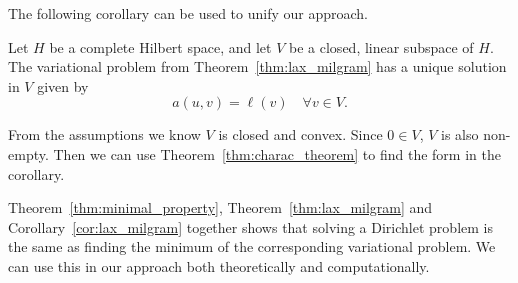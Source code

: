 The following corollary can be used to unify our approach.
\begin{kor}{\quad}
    Let $H$ be a complete Hilbert space, and let $V$ be a closed, linear subspace of $H$. The variational problem from Theorem~\ref{thm:lax_milgram} has a unique solution in $V$ given by\label{cor:lax_milgram}
   \begin{equation*}
    a(u,v) = \ell(v) \quad \forall v \in V.
   \end{equation*}
   \vspace{-8mm}
\end{kor}
\begin{bev}
    From the assumptions we know $V$ is closed and convex. Since $0 \in V$, $V$ is also non-empty. Then we can use Theorem~\ref{thm:charac_theorem} to find the form in the corollary.
\end{bev}
Theorem~\ref{thm:minimal_property}, Theorem~\ref{thm:lax_milgram} and Corollary~\ref{cor:lax_milgram} together shows that solving a Dirichlet problem is 
the same as finding the minimum of the corresponding variational problem. 
We can use this in our approach both theoretically and computationally.